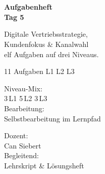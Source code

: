 \documentclass[11pt,a4paper,oneside]{article}
\begin{document}
\begin{titlepage}
  \pagestyle{empty}
  \vspace*{1.5cm}
  \\[2pt]
  \noindent{\color{lpAccent}\rule{\linewidth}{1.2pt}}\\[4pt]

  \vspace{3cm}
  {\sffamily\fontsize{30}{34}\selectfont\bfseries\color{lpInk}Aufgabenheft\\Tag 5\par}

  \vspace{0.7cm}
  {\sffamily\large\color{lpGray}Digitale Vertriebsstrategie,\\Kundenfokus \& Kanalwahl\\\textendash{} elf Aufgaben auf drei Niveaus.\par}

  \vspace{1.5cm}
  {\caveatfont\LARGE\color{lpAmber}11 Aufgaben \textperiodcentered{} L1 \textperiodcentered{} L2 \textperiodcentered{} L3}\par

  \vfill

  \noindent\begin{minipage}{0.55\linewidth}
    {\sffamily\footnotesize\color{lpGray}Niveau-Mix:}\\
    {\sffamily\small\color{lpInk}3\,\textsf{L1} \textperiodcentered{} 5\,\textsf{L2} \textperiodcentered{} 3\,\textsf{L3}}\\[10pt]
    {\sffamily\footnotesize\color{lpGray}Bearbeitung:}\\
    {\sffamily\small\color{lpInk}Selbstbearbeitung im Lernpfad}
  \end{minipage}\hfill
  \begin{minipage}{0.4\linewidth}
    \raggedleft
    {\sffamily\footnotesize\color{lpGray}Dozent:}\\
    {\sffamily\small\color{lpInk}Can Siebert}\\[10pt]
    {\sffamily\footnotesize\color{lpGray}Begleitend:}\\
    {\sffamily\small\color{lpInk}Lehrskript \& Lösungsheft}
  \end{minipage}

  \vspace{0.5cm}
  \noindent{\color{lpAccent}\rule{\linewidth}{0.6pt}}
\end{titlepage}
\end{document}

